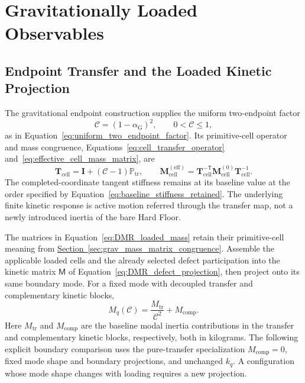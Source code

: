 \section{Gravitationally Loaded Observables}
\label{sec:DMR_gravity}

\subsection{Endpoint Transfer and the Loaded Kinetic Projection}

The gravitational endpoint construction supplies the uniform two-endpoint factor
\begin{equation}
 \mathcal C=(1-\alpha_{\mathrm G})^2,
 \qquad 0<\mathcal C\leq1,
\label{eq:DMR_loading_factor}
\end{equation}
as in Equation~\eqref{eq:uniform_two_endpoint_factor}. Its primitive-cell operator and mass congruence, Equations~\eqref{eq:cell_transfer_operator} and~\eqref{eq:effective_cell_mass_matrix}, are
\begin{equation}
 \mathbf T_{\mathrm{cell}}=\mathbf I+(\mathcal C-1)\mathbb P_{\mathrm{tr}},
 \qquad
 \mathbf M_{\mathrm{cell}}^{(\mathrm{eff})}=
 \mathbf T_{\mathrm{cell}}^{-\mathsf T}
 \mathbf M_{\mathrm{cell}}^{(0)}
 \mathbf T_{\mathrm{cell}}^{-1}.
\label{eq:DMR_loaded_mass}
\end{equation}
The completed-coordinate tangent stiffness remains at its baseline value at the order specified by Equation~\eqref{eq:baseline_stiffness_retained}. The underlying finite kinetic response is active motion referred through the transfer map, not a newly introduced inertia of the bare Hard Floor.

The matrices in Equation~\eqref{eq:DMR_loaded_mass} retain their primitive-cell meaning from \hyperref[sec:grav_mass_matrix_congruence]{Section~\ref*{sec:grav_mass_matrix_congruence}}. Assemble the applicable loaded cells and the already selected defect participation into the kinetic matrix $\mathsf M$ of Equation~\eqref{eq:DMR_defect_projection}, then project onto its same boundary mode. For a fixed mode with decoupled transfer and complementary kinetic blocks,
\begin{equation}
 M_q(\mathcal C)=\frac{M_{\mathrm{tr}}}{\mathcal C^2}+M_{\mathrm{comp}}.
\label{eq:DMR_mixed_inertia}
\end{equation}
Here $M_{\mathrm{tr}}$ and $M_{\mathrm{comp}}$ are the baseline modal inertia contributions in the transfer and complementary kinetic blocks, respectively, both in kilograms. The following explicit boundary comparison uses the pure-transfer specialization $M_{\mathrm{comp}}=0$, fixed mode shape and boundary projections, and unchanged $k_q$. A configuration whose mode shape changes with loading requires a new projection.

